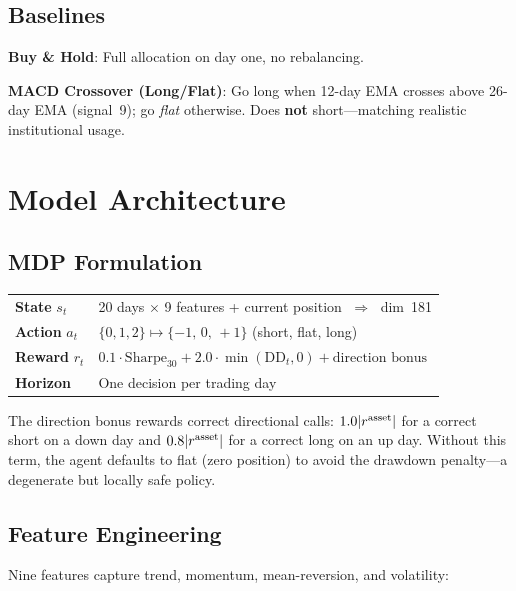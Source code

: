 \documentclass[12pt,a4paper]{article}
\begin{document}
\subsection{Baselines}

\textbf{Buy \& Hold}: Full allocation on day one, no rebalancing.

\textbf{MACD Crossover (Long/Flat)}: Go long when 12-day EMA crosses above
26-day EMA (signal~9); go \emph{flat} otherwise. Does \textbf{not} short---matching
realistic institutional usage.

\section{Model Architecture}

\subsection{MDP Formulation}

\begin{tcolorbox}[mdpbox,title=MDP---Single-Asset Signal Trading]
\begin{tabular}{@{}ll@{}}
\textbf{State} $s_t$ &
  20 days $\times$ 9 features + current position $\;\Rightarrow\;$ dim~181\\[3pt]
\textbf{Action} $a_t$ &
  $\{0,1,2\}\mapsto\{-1,\,0,\,+1\}$ (short, flat, long) \\[3pt]
\textbf{Reward} $r_t$ &
  $0.1\cdot\mathrm{Sharpe}_{30} + 2.0\cdot\min(\mathrm{DD}_t,0)
   + \text{direction bonus}$ \\[3pt]
\textbf{Horizon} & One decision per trading day \\
\end{tabular}
\end{tcolorbox}

The direction bonus rewards correct directional calls:
$1.0|r^{\rm asset}|$ for a correct short on a down day and
$0.8|r^{\rm asset}|$ for a correct long on an up day. Without this term,
the agent defaults to flat (zero position) to avoid the drawdown penalty---a
degenerate but locally safe policy.

\subsection{Feature Engineering}

Nine features capture trend, momentum, mean-reversion, and volatility:
\end{document}
